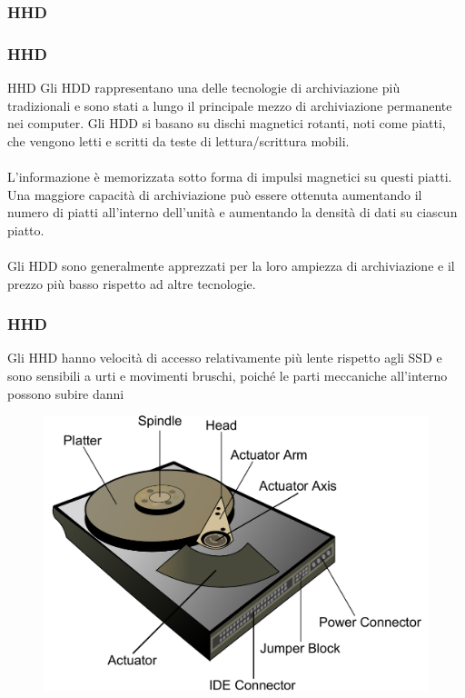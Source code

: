 \subsubsection[HHD]{HHD}
\begin{frame}
	\frametitle{HHD}
	  
	\begin{block}{HHD}
		Gli HDD rappresentano una delle tecnologie di archiviazione più tradizionali e sono stati a lungo il principale mezzo di archiviazione permanente nei computer. Gli HDD si basano su dischi magnetici rotanti, noti come piatti, che vengono letti e scritti da teste di lettura/scrittura mobili.\\~\\ L'informazione è memorizzata sotto forma di impulsi magnetici su questi piatti. Una maggiore capacità di archiviazione può essere ottenuta aumentando il numero di piatti all'interno dell'unità e aumentando la densità di dati su ciascun piatto.\\~\\
		Gli HDD sono generalmente apprezzati per la loro ampiezza di archiviazione e il prezzo più basso rispetto ad altre tecnologie.
	\end{block}
\end{frame}


\begin{frame}
	\frametitle{HHD}
	  
	\begin{block}{}
		 Gli HHD hanno velocità di accesso relativamente più lente rispetto agli SSD e sono sensibili a urti e movimenti bruschi, poiché le parti meccaniche all'interno possono subire danni	 
	\end{block}
	\begin{figure}[!htbp]
		\centering 
		\includegraphics[width=0.65\linewidth]{images/5_memory/hhd_info_1.pdf}
		\label{fig:memory_hdd_info_1}
	\end{figure}
\end{frame}



